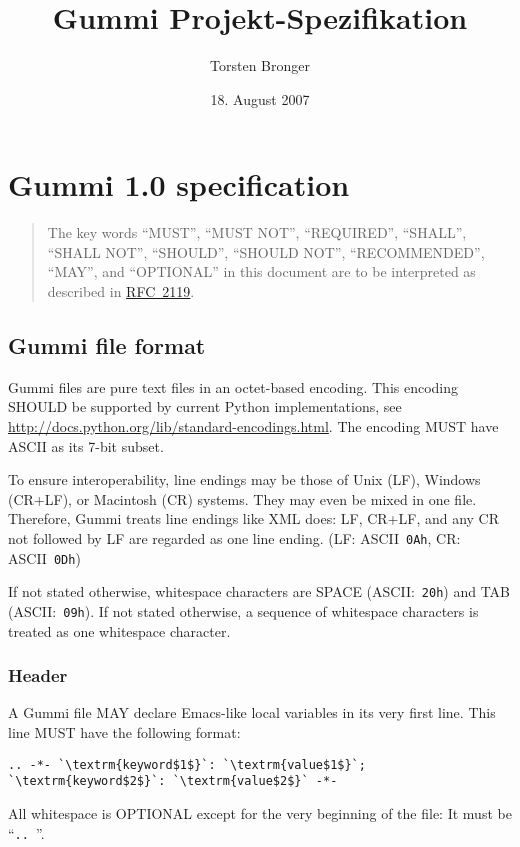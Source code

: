 \documentclass[12pt,openany]{book}
\begin{document}
\title{Gummi Projekt-Spezifikation}
\author{Torsten Bronger}
\date{18. August 2007}
\maketitle

\tableofcontents


\chapter{Gummi 1.0 specification}

\begin{quotation}
  The key words ``MUST'', ``MUST NOT'', ``REQUIRED'', ``SHALL'', ``SHALL NOT'',
  ``SHOULD'', ``SHOULD NOT'', ``RECOMMENDED'', ``MAY'', and ``OPTIONAL'' in
  this document are to be interpreted as described in
  \href{http://tools.ietf.org/html/rfc2119}{RFC~2119}.
\end{quotation}
      
\section{Gummi file format}

Gummi files are pure text files in an octet-based encoding.  This encoding
SHOULD be supported by current Python implementations, see
\url{http://docs.python.org/lib/standard-encodings.html}.  The encoding MUST
have ASCII as its \mbox{7-bit} subset.

To ensure interoperability, line endings may be those of Unix (LF), Windows
(CR+LF), or Macintosh (CR) systems.  They may even be mixed in one file.
Therefore, Gummi treats line endings like XML does: LF, CR+LF, and any CR not
followed by LF are regarded as one line ending.  (LF: ASCII~\verb|0Ah|, CR:
ASCII~\verb|0Dh|)

If not stated otherwise, whitespace characters are SPACE (ASCII:~\verb|20h|)
and TAB (ASCII:~\verb|09h|).  If not stated otherwise, a sequence of whitespace
characters is treated as one whitespace character.

\subsection{Header}

A Gummi file MAY declare Emacs-like local variables in its very first line.
This line MUST have the following format:
\begin{lstlisting}[escapechar=`]
.. -*- `\textrm{keyword$1$}`: `\textrm{value$1$}`; `\textrm{keyword$2$}`: `\textrm{value$2$}` -*-
\end{lstlisting}
All whitespace is OPTIONAL except for the very beginning of the file: It must
be ``\verb*|.. |''.
\end{document}
